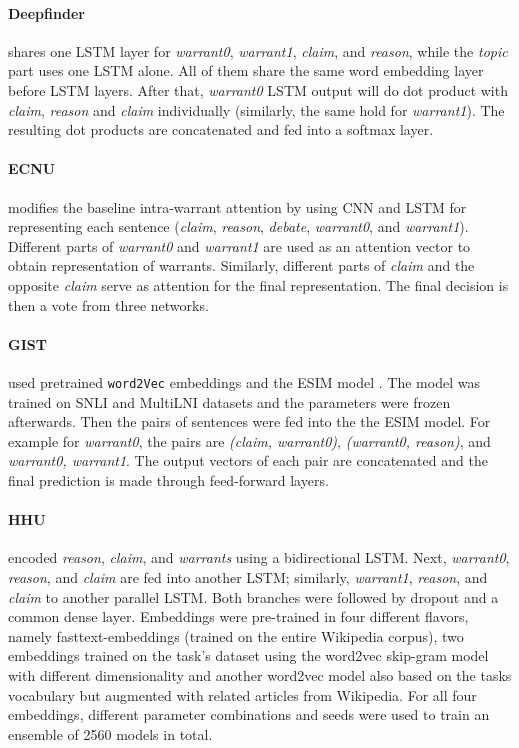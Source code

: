 \paragraph{Deepfinder}
shares one LSTM layer for \emph{warrant0}, \emph{warrant1}, \emph{claim}, and \emph{reason}, while the \emph{topic} part uses one LSTM alone. All of them share the same word embedding layer before LSTM layers. After that, \emph{warrant0} LSTM output will do dot product with \emph{claim}, \emph{reason} and \emph{claim} individually (similarly, the same hold for \emph{warrant1}). The resulting dot products are concatenated and fed into a softmax layer.


\paragraph{ECNU}
modifies the baseline intra-warrant attention \cite{habernal.et.al.2018.NAACL.arct} by using CNN and LSTM for representing each sentence (\emph{claim}, \emph{reason}, \emph{debate}, \emph{warrant0}, and \emph{warrant1}). Different parts of \emph{warrant0} and \emph{warrant1} are used as an attention vector to obtain representation of warrants. Similarly, different parts of \emph{claim} and the opposite \emph{claim} serve as attention for the final representation. The final decision is then a vote from three networks.


\paragraph{GIST} used pretrained \texttt{word2Vec} embeddings and the ESIM model \cite{Chen.et.al.2017.ACL.ESIM}. The model was trained on SNLI \cite{Bowman.et.al.2015} and MultiLNI \cite{nangia-EtAl:2017:RepEval} datasets and the parameters were frozen afterwards. Then the pairs of sentences were fed into the the ESIM model. For example for \emph{warrant0}, the pairs are \emph{(claim, warrant0)}, \emph{(warrant0, reason)}, and \emph{warrant0, warrant1}. The output vectors of each pair are concatenated and the final prediction is made through feed-forward layers.


\paragraph{HHU}
encoded \emph{reason}, \emph{claim}, and \emph{warrants} using a bidirectional LSTM. Next, \emph{warrant0}, \emph{reason}, and \emph{claim} are fed into another LSTM; similarly, \emph{warrant1}, \emph{reason}, and \emph{claim} to another parallel LSTM. Both branches were followed by dropout and a common dense layer. Embeddings were pre-trained in four different flavors, namely fasttext-embeddings (trained on the entire Wikipedia corpus), two embeddings trained on the task's dataset using the word2vec skip-gram model with different dimensionality and another word2vec model also based on the tasks vocabulary but augmented with related articles from Wikipedia. For all four embeddings, different parameter combinations and seeds were used to train an ensemble of 2560 models in total.


